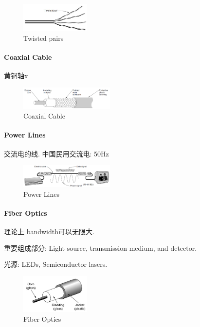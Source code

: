\begin{figure}[!htb]
    \centering
    \includegraphics[width=0.309\textwidth]{pic/CN2/Twisted pairs.png}
    \caption{Twisted pairs}
\end{figure}

\paragraph{Coaxial Cable}黄铜轴x
\begin{figure}[!htb]
    \centering
    \includegraphics[width=0.42\textwidth]{pic/CN2/Coaxial Cable}
    \caption{Coaxial Cable}
\end{figure}

\paragraph{Power Lines}交流电的线. 中国民用交流电: 50Hz
\begin{figure}[!htb]
    \centering
    \includegraphics[width=0.42\textwidth]{pic/CN2/Power Lines}
    \caption{Power Lines}
\end{figure}

\paragraph{Fiber Optics}理论上 bandwidth可以无限大. 

重要组成部分: Light source, transmission medium, and detector. 

光源: LEDs, Semiconductor lasers.

\begin{figure}[!htb]
    \centering
    \includegraphics[width=0.309\textwidth]{pic/CN2/Fiber Optics}
    \caption{Fiber Optics}
\end{figure}

